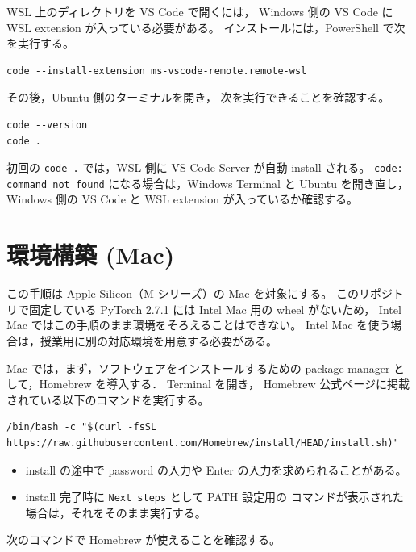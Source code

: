 WSL 上のディレクトリを VS Code で開くには，
Windows 側の VS Code に WSL extension が入っている必要がある。
インストールには，PowerShell で次を実行する。

\begin{lstlisting}[style=codecell]
code --install-extension ms-vscode-remote.remote-wsl
\end{lstlisting}

その後，Ubuntu 側のターミナルを開き，
次を実行できることを確認する。

\begin{lstlisting}[style=codecell]
code --version
code .
\end{lstlisting}

初回の \texttt{code .} では，WSL 側に VS Code Server が自動 install される。
\texttt{code: command not found} になる場合は，Windows Terminal と Ubuntu を開き直し，
Windows 側の VS Code と WSL extension が入っているか確認する。

\section{環境構築 (Mac)}

この手順は Apple Silicon（M シリーズ）の Mac を対象にする。
このリポジトリで固定している PyTorch 2.7.1 には Intel Mac 用の wheel がないため，
Intel Mac ではこの手順のまま環境をそろえることはできない。
Intel Mac を使う場合は，授業用に別の対応環境を用意する必要がある。

Mac では，まず，ソフトウェアをインストールするための
package manager として，Homebrew を導入する．
Terminal を開き，
Homebrew 公式ページに掲載されている以下のコマンドを実行する。

\begin{lstlisting}[style=codecell]
/bin/bash -c "$(curl -fsSL https://raw.githubusercontent.com/Homebrew/install/HEAD/install.sh)"
\end{lstlisting}

\begin{itemize}
\item install の途中で password の入力や Enter の入力を求められることがある。

\item install 完了時に \texttt{Next steps} として PATH 設定用の コマンドが表示された場合は，それをそのまま実行する。

\end{itemize}

次のコマンドで Homebrew が使えることを確認する。

